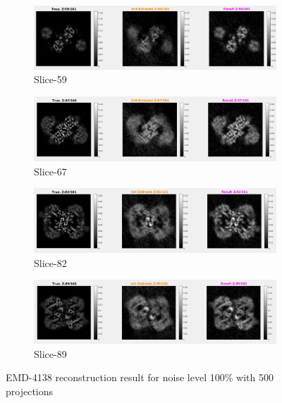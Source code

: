 \documentclass[twoside]{iitbreport}
\begin{document}
\begin{figure}[H]
\centering

\begin{subfigure}{1\textwidth}
\centering
\includegraphics[width=1\linewidth]{emd_4138_result_1.png}
\captionsetup{justification=centering}
\caption{ Slice-59 }
\end{subfigure} 

\begin{subfigure}{1\textwidth}
\centering
\includegraphics[width=1\linewidth]{emd_4138_result_2.png}
\captionsetup{justification=centering}
\caption{ Slice-67 }
\end{subfigure} 

\begin{subfigure}{1\textwidth}
\centering
\includegraphics[width=1\linewidth]{emd_4138_result_3.png}
\captionsetup{justification=centering}
\caption{ Slice-82 }
\end{subfigure} 

\begin{subfigure}{1\textwidth}
\centering
\includegraphics[width=1\linewidth]{emd_4138_result_4.png}
\captionsetup{justification=centering}
\caption{ Slice-89 }
\end{subfigure} 
\captionsetup{justification=centering}
\caption{EMD-4138 reconstruction result for noise level 100\% with 500 projections}
\label{fig:EMD-4138 Reconstruction: Result-noise 100}
\end{figure}
\end{document}
